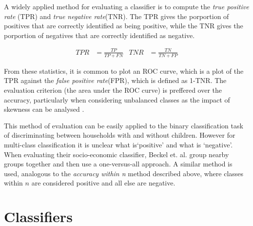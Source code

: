 A widely applied method for evaluating a classifier is to compute the \textit{true positive rate} (TPR) and \textit{true negative rate}(TNR). The TPR gives the porportion of positives that are correctly identified as being positive, while the TNR gives the porportion of negatives that are correctly identified as negative.

\begin{align*}
TPR&=\frac{TP}{TP+FN}   &   TNR&=\frac{TN}{TN+FP}   
\end{align*}

From these statistics, it is common to plot an ROC curve, which is a plot of the TPR against the \textit{false positive rate}(FPR), which is defined as 1-TNR. The evaluation criterion (the area under the ROC curve) is preffered over the accuracy, particularly when considering unbalanced classes as the impact of skewness can be analysed \cite{Waegeman}.

This method of evaluation can be easily applied to the binary classification task of discriminating between households with and without children. However for multi-class classification it is unclear what is`positive' and what is `negative'. When evaluating their socio-economic classifier, Beckel et. al. group nearby groups together and then use a one-versus-all approach\cite{Beckel_2,Beckel_3}. A similar method is used, analogous to the \textit{accuracy within n} method described above, where classes within $n$ are considered positive and all else are negative.



\section{Classifiers}